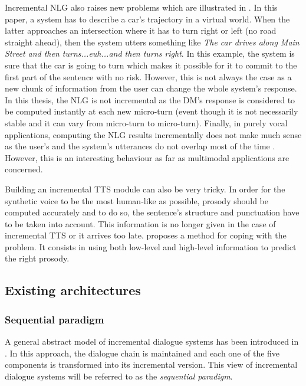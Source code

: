 Incremental NLG also raises new problems which are illustrated in \cite{Baumann2013}. In this paper, a system has to describe a car's trajectory in a virtual world. When the latter approaches an intersection where it has to turn right or left (no road straight ahead), then the system utters something like \textit{The car drives along Main Street and then turns...euh...and then turns right}. In this example, the system is sure that the car is going to turn which makes it possible for it to commit to the first part of the sentence with no risk. However, this is not always the case as a new chunk of information from the user can change the whole system's response. In this thesis, the NLG is not incremental as the DM's response is considered to be computed instantly at each new micro-turn (event though it is not necessarily stable and it can vary from micro-turn to micro-turn). Finally, in purely vocal applications, computing the NLG results incrementally does not make much sense as the user's and the system's utterances do not overlap most of the time \cite{Sacks1974}. However, this is an interesting behaviour as far as multimodal applications are concerned.

Building an incremental TTS module can also be very tricky. In order for the synthetic voice to be the most human-like as possible, prosody should be computed accurately and to do so, the sentence's structure and punctuation have to be taken into account. This information is no longer given in the case of incremental TTS or it arrives too late. \cite{Baumann2014} proposes a method for coping with the problem. It consists in using both low-level and high-level information to predict the right prosody.


\subsection{Existing architectures}
\subsubsection{Sequential paradigm}

A general abstract model of incremental dialogue systems has been introduced in \cite{Schlangen2011}. In this approach, the dialogue chain is maintained and each one of the five components is transformed into its incremental version. This view of incremental dialogue systems will be referred to as the \textit{sequential paradigm}.

